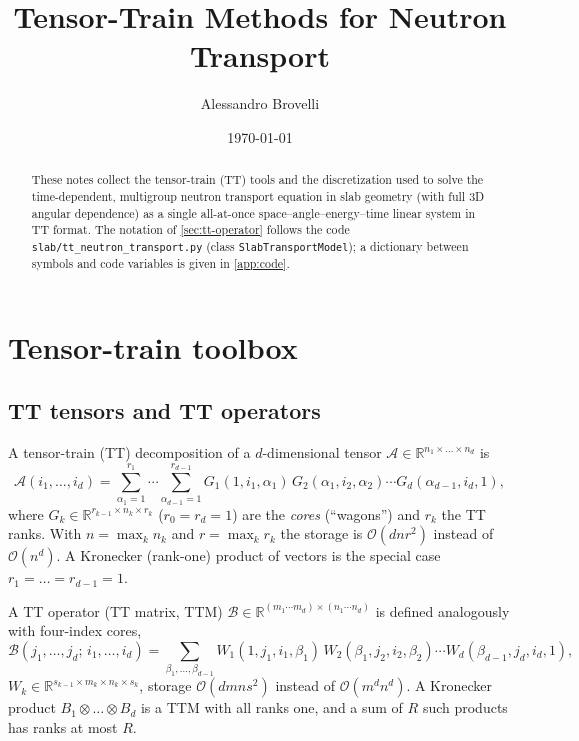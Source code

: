 \documentclass[11pt,a4paper]{article}
\title{Tensor-Train Methods for Neutron Transport}
\author{Alessandro Brovelli}
\date{\today}
\numberwithin{equation}{section}
\theoremstyle{remark}
\newcommand{\kron}{\otimes}
\newcommand{\R}{\mathbb{R}}
\begin{document}
\maketitle

\begin{abstract}
These notes collect the tensor-train (TT) tools and the discretization used to solve the time-dependent,
multigroup neutron transport equation in slab geometry (with full 3D angular dependence) as a single
all-at-once space--angle--energy--time linear system in TT format. The notation of
\cref{sec:tt-operator} follows the code \texttt{slab/tt\_neutron\_transport.py} (class \texttt{SlabTransportModel});
a dictionary between symbols and code variables is given in \cref{app:code}.
\end{abstract}

\tableofcontents
\newpage

\section{Tensor-train toolbox}
\label{sec:tt}

\subsection{TT tensors and TT operators}

A tensor-train (TT) decomposition of a $d$-dimensional tensor $\mathcal{A}\in\R^{n_1\times\dots\times n_d}$ is \cite{TT_Ose}
\begin{equation}
\mathcal{A}(i_1,\dots,i_d)=\sum_{\alpha_1=1}^{r_1}\cdots\sum_{\alpha_{d-1}=1}^{r_{d-1}}
G_1(1,i_1,\alpha_1)\,G_2(\alpha_1,i_2,\alpha_2)\cdots G_d(\alpha_{d-1},i_d,1),
\label{eq:tt}
\end{equation}
where $G_k\in\R^{r_{k-1}\times n_k\times r_k}$ ($r_0=r_d=1$) are the \emph{cores} (``wagons'') and $r_k$ the TT ranks.
With $n=\max_k n_k$ and $r=\max_k r_k$ the storage is $\mathcal{O}(dnr^2)$ instead of $\mathcal{O}(n^d)$.
A Kronecker (rank-one) product of vectors is the special case $r_1=\dots=r_{d-1}=1$.

A TT operator (TT matrix, TTM) $\mathcal{B}\in\R^{(m_1\cdots m_d)\times(n_1\cdots n_d)}$ is defined analogously with four-index cores,
\begin{equation}
\mathcal{B}(j_1,\dots,j_d;\,i_1,\dots,i_d)=\sum_{\beta_1,\dots,\beta_{d-1}}
W_1(1,j_1,i_1,\beta_1)\,W_2(\beta_1,j_2,i_2,\beta_2)\cdots W_d(\beta_{d-1},j_d,i_d,1),
\end{equation}
$W_k\in\R^{s_{k-1}\times m_k\times n_k\times s_k}$, storage $\mathcal{O}(dmns^2)$ instead of $\mathcal{O}(m^dn^d)$.
A Kronecker product $B_1\kron\dots\kron B_d$ is a TTM with all ranks one, and a sum of $R$ such products has ranks at most $R$.
\end{document}
